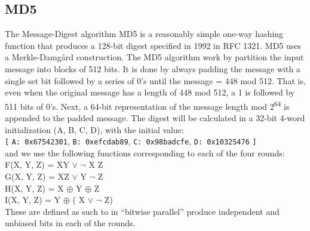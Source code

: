 \documentclass[a4paper]{article}
\begin{document}
\subsection{MD5}
\label{MD5alg}
The Message-Digest algorithm MD5 is a reasonably simple one-way hashing function that produces a 128-bit digest specified in 1992 in RFC 1321\cite{rfc1321}. MD5 uses a Merkle-Damgård construction.
The MD5 algorithm work by partition the input message into blocks of 512 bits. It is done by always padding the message with a single set bit followed by a series of 0's until the message = 448 mod 512. That is, even when the original message has a length of 448 mod 512, a 1 is followed by 511 bits of 0's.
Next, a 64-bit representation of the message length mod 2\textsuperscript{64} is appended to the padded message.
The digest will be calculated in a 32-bit 4-word initialization (A, B, C, D), with the initial value:\\
\texttt{[} \texttt{A: 0x67542301}, \texttt{B: 0xefcdab89}, \texttt{C: 0x98badcfe}, \texttt{D: 0x10325476} \texttt{]}\\
and we use the following functions corresponding to each of the four rounds:\\
F(X, Y, Z) = XY \(\vee\) \(\neg{}\) X Z\\
G(X, Y, Z) = XZ \(\vee\) Y \(\neg{}\) Z\\
H(X, Y, Z) = X \(\oplus\) Y \(\oplus\) Z\\
I(X, Y, Z) = Y \(\oplus\) ( X \(\vee\) \(\neg{}\) Z)\\
These are defined as such to in ``bitwise parallel'' produce independent and unbiased bits in each of the rounds.
\end{document}
